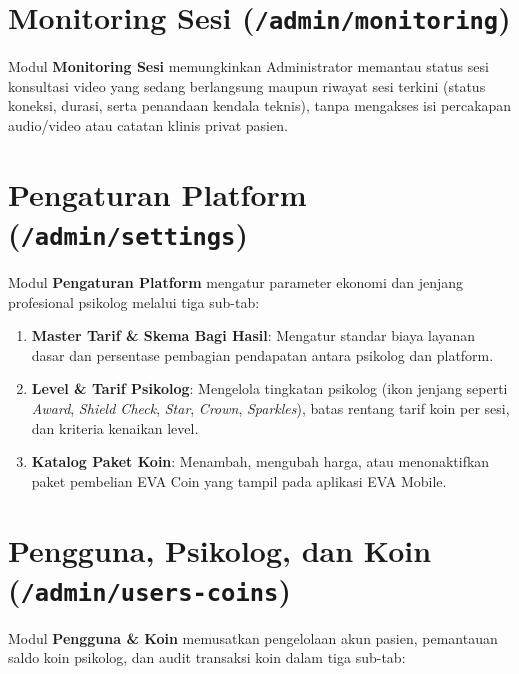 \section{Monitoring Sesi (\texttt{/admin/monitoring})}
Modul \textbf{Monitoring Sesi} memungkinkan Administrator memantau status sesi konsultasi video yang sedang berlangsung maupun riwayat sesi terkini (status koneksi, durasi, serta penandaan kendala teknis), tanpa mengakses isi percakapan audio/video atau catatan klinis privat pasien.


\section{Pengaturan Platform (\texttt{/admin/settings})}
Modul \textbf{Pengaturan Platform} mengatur parameter ekonomi dan jenjang profesional psikolog melalui tiga sub-tab:
\begin{enumerate}[leftmargin=1.4em]
  \item \textbf{Master Tarif \& Skema Bagi Hasil}: Mengatur standar biaya layanan dasar dan persentase pembagian pendapatan antara psikolog dan platform.
  \item \textbf{Level \& Tarif Psikolog}: Mengelola tingkatan psikolog (ikon jenjang seperti \textit{Award}, \textit{Shield Check}, \textit{Star}, \textit{Crown}, \textit{Sparkles}), batas rentang tarif koin per sesi, dan kriteria kenaikan level.
  \item \textbf{Katalog Paket Koin}: Menambah, mengubah harga, atau menonaktifkan paket pembelian EVA Coin yang tampil pada aplikasi EVA Mobile.
\end{enumerate}


\section{Pengguna, Psikolog, dan Koin (\texttt{/admin/users-coins})}
Modul \textbf{Pengguna \& Koin} memusatkan pengelolaan akun pasien, pemantauan saldo koin psikolog, dan audit transaksi koin dalam tiga sub-tab:

